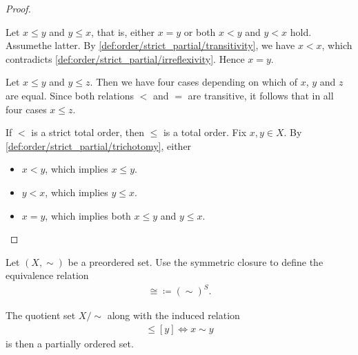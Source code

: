 \begin{proof}
\begin{description}
     Let $x \leq y$ and $y \leq x$, that is, either $x = y$ or both $x < y$ and $y < x$ hold. Assume\LEM the latter. By \ref{def:order/strict_partial/transitivity}, we have $x < x$, which contradicts \ref{def:order/strict_partial/irreflexivity}. Hence $x = y$.

     Let $x \leq y$ and $y \leq z$. Then we have four cases depending on which of $x$, $y$ and $z$ are equal. Since both relations $<$ and $=$ are transitive, it follows that in all four cases $x \leq z$.

     If $<$ is a strict total order, then $\leq$ is a total order. Fix $x, y \in X$. By \ref{def:order/strict_partial/trichotomy}, either
    \begin{itemize}
      \item $x < y$, which implies $x \leq y$.
      \item $y < x$, which implies $y \leq x$.
      \item $x = y$, which implies both $x \leq y$ and $y \leq x$.
    \end{itemize}
  \end{description}
\end{proof}

\begin{proposition}\label{thm:preorder_to_partial_order}
  Let $(X, \sim)$ be a preordered set. Use the symmetric closure to define the equivalence relation
  \begin{align*}
    \cong \coloneqq (\sim)^S.
  \end{align*}

  The quotient set $X / \sim$ along with the induced relation
  \begin{align*}
    [x] \leq [y] \iff x \sim y
  \end{align*}
  is then a partially ordered set.
\end{proposition}
